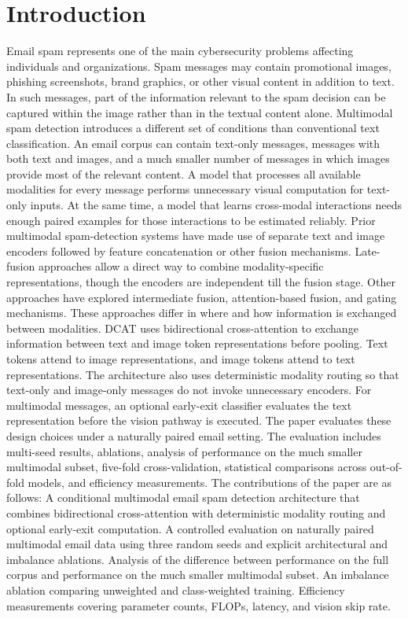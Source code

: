 \documentclass[conference]{IEEEtran}
\begin{document}
\section{Introduction}
Email spam represents one of the main cybersecurity problems affecting individuals and organizations. Spam messages may contain promotional images, phishing screenshots, brand graphics, or other visual content in addition to text. In such messages, part of the information relevant to the spam decision can be captured within the image rather than in the textual content alone.
Multimodal spam detection introduces a different set of conditions than conventional text classification. An email corpus can contain text-only messages, messages with both text and images, and a much smaller number of messages in which images provide most of the relevant content. A model that processes all available modalities for every message performs unnecessary visual computation for text-only inputs. At the same time, a model that learns cross-modal interactions needs enough paired examples for those interactions to be estimated reliably.
Prior multimodal spam-detection systems have made use of separate text and image encoders followed by feature concatenation or other fusion mechanisms. Late-fusion approaches allow a direct way to combine modality-specific representations, though the encoders are independent till the fusion stage. Other approaches have explored intermediate fusion, attention-based fusion, and gating mechanisms. These approaches differ in where and how information is exchanged between modalities.
DCAT uses bidirectional cross-attention to exchange information between text and image token representations before pooling. Text tokens attend to image representations, and image tokens attend to text representations. The architecture also uses deterministic modality routing so that text-only and image-only messages do not invoke unnecessary encoders. For multimodal messages, an optional early-exit classifier evaluates the text representation before the vision pathway is executed.
The paper evaluates these design choices under a naturally paired email setting. The evaluation includes multi-seed results, ablations, analysis of performance on the much smaller multimodal subset, five-fold cross-validation, statistical comparisons across out-of-fold models, and efficiency measurements.
The contributions of the paper are as follows:
A conditional multimodal email spam detection architecture that combines bidirectional cross-attention with deterministic modality routing and optional early-exit computation.
A controlled evaluation on naturally paired multimodal email data using three random seeds and explicit architectural and imbalance ablations.
Analysis of the difference between performance on the full corpus and performance on the much smaller multimodal subset.
An imbalance ablation comparing unweighted and class-weighted training.
Efficiency measurements covering parameter counts, FLOPs, latency, and vision skip rate.
\end{document}

